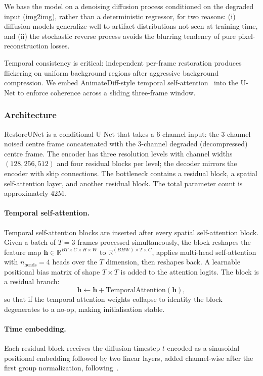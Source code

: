 \documentclass[10pt, conference]{IEEEtran}
\begin{document}
We base the model on a denoising diffusion process conditioned on the degraded input (img2img), rather than a deterministic regressor, for two reasons: (i) diffusion models generalize well to artifact distributions not seen at training time, and (ii) the stochastic reverse process avoids the blurring tendency of pure pixel-reconstruction losses.

Temporal consistency is critical: independent per-frame restoration produces flickering on uniform background regions after aggressive background compression. We embed AnimateDiff-style temporal self-attention~\cite{Guo_2023_AnimateDiff} into the U-Net to enforce coherence across a sliding three-frame window.

\subsubsection{Architecture}

RestoreUNet is a conditional U-Net that takes a 6-channel input: the 3-channel noised centre frame concatenated with the 3-channel degraded (decompressed) centre frame. The encoder has three resolution levels with channel widths $(128, 256, 512)$ and four residual blocks per level; the decoder mirrors the encoder with skip connections. The bottleneck contains a residual block, a spatial self-attention layer, and another residual block. The total parameter count is approximately 42M.

\paragraph{Temporal self-attention.}
Temporal self-attention blocks are inserted after every spatial self-attention block. Given a batch of $T{=}3$ frames processed simultaneously, the block reshapes the feature map $\mathbf{h} \in \mathbb{R}^{B T \times C \times H \times W}$ to $\mathbb{R}^{(B H W) \times T \times C}$, applies multi-head self-attention with $n_{\text{heads}}{=}4$ heads over the $T$ dimension, then reshapes back. A learnable positional bias matrix of shape $T \times T$ is added to the attention logits. The block is a residual branch:
\begin{equation}
\mathbf{h} \leftarrow \mathbf{h} + \text{TemporalAttention}(\mathbf{h}),
\end{equation}
so that if the temporal attention weights collapse to identity the block degenerates to a no-op, making initialisation stable.

\paragraph{Time embedding.}
Each residual block receives the diffusion timestep $t$ encoded as a sinusoidal positional embedding followed by two linear layers, added channel-wise after the first group normalization, following~\cite{Ho_2020_DDPM}.
\end{document}
